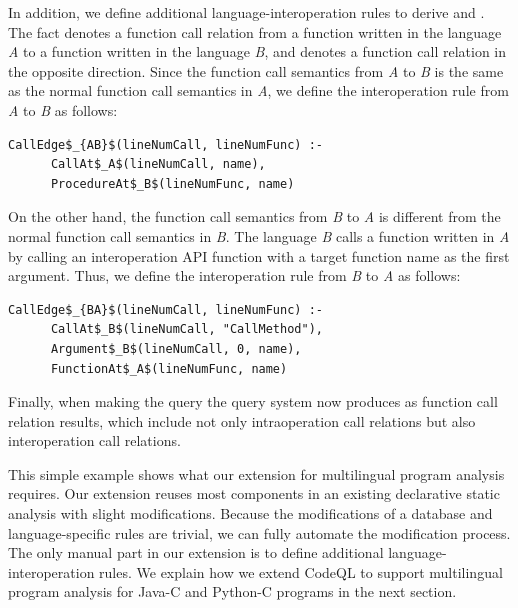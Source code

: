 \noindent
In addition, we define additional language-interoperation rules to derive  and . The fact  denotes a function call relation from a function written in
the language {\it A} to a function written in the language {\it B}, and  denotes a function call relation in the opposite direction.
Since the function call semantics from {\it A} to {\it B} is the same as the
normal function call semantics in {\it A}, we define the interoperation rule from {\it
A} to {\it B} as follows: 

\begin{lstlisting}[style=mrule]
    CallEdge$_{AB}$(lineNumCall, lineNumFunc) :-
      CallAt$_A$(lineNumCall, name),
      ProcedureAt$_B$(lineNumFunc, name)
\end{lstlisting}

\noindent
On the other hand, the function call semantics from {\it B} to {\it A} is
different from the normal function call semantics in {\it B}. The language {\it B} calls
a function written in {\it A} by calling an interoperation API function  with a target function name as the first argument. Thus, we define
the interoperation rule from {\it B} to {\it A} as follows: 

\begin{lstlisting}[style=mrule]
    CallEdge$_{BA}$(lineNumCall, lineNumFunc) :-
      CallAt$_B$(lineNumCall, "CallMethod"),
      Argument$_B$(lineNumCall, 0, name),
      FunctionAt$_A$(lineNumFunc, name)
\end{lstlisting}

Finally, when making the query   the query system now produces
  as function call
relation results, which include not only intraoperation call relations but also
interoperation call relations.

This simple example shows what our extension for multilingual program analysis
requires. Our extension reuses most components in an existing declarative static
analysis with slight modifications. Because the modifications of a database and
language-specific rules are trivial, we can fully automate the modification
process.  The only manual part in our extension is to define additional
language-interoperation rules. We explain how we extend CodeQL to support
multilingual program analysis for Java-C and Python-C programs in the next section.
